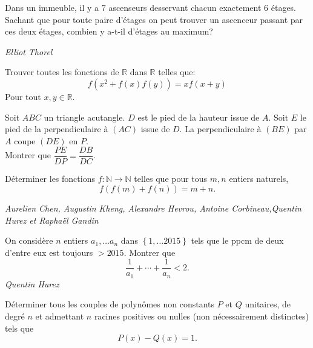 \begin{exo}{}
Dans un immeuble, il y a $7$ ascenseurs desservant chacun exactement $6$ étages. Sachant que pour toute paire d'étages on peut trouver un ascenceur passant par ces deux étages, combien y a-t-il d'étages au maximum?

\medskip
\textit{Elliot Thorel}

\end{exo}



\begin{exo}{}
Trouver toutes les fonctions de $\mathbb{R}$ dans $\mathbb{R}$ telles que:
$$f(x^2+f(x)f(y))=xf(x+y)$$
Pour tout $x,y\in \mathbb{R}$.
\end{exo}



\begin{exo}{}
Soit $ABC$ un triangle acutangle. $D$ est le pied de la hauteur issue de $A$. Soit $E$ le
pied de la perpendiculaire à $(AC)$ issue de $D$. La perpendiculaire à $(BE)$ par $A$ coupe $(DE)$ en $P$. \\
Montrer que $\dfrac{PE}{DP}=\dfrac{DB}{DC}$.
\end{exo}


\begin{exo}{}
Déterminer les fonctions $f : \mathbb{N} \rightarrow \mathbb{N}$ telles que pour tous $m,n$ entiers naturels, $$f(f(m)+f(n))=m+n.$$

\medskip
\textit{Aurelien Chen, Augustin Kheng, Alexandre Hevrou, Antoine Corbineau,Quentin Hurez et Raphaël Gandin}

\end{exo}

\begin{exo}{}
On considère $n$ entiers $a_{1},\ldots a_{n}$
dans $\left\{ 1,\ldots2015\right\} $ tels que le ppcm de deux d'entre
eux est toujours $>2015$. Montrer que
\[
\frac{1}{a_{1}}+\cdots+\frac{1}{a_{n}}<2.
\]
\medskip
\textit{Quentin Hurez}

\end{exo}

\begin{exo}{}Déterminer tous les couples de polynômes non constants $P$ et $Q$ unitaires, de degré $n$ et admettant $n$ racines positives ou nulles (non nécessairement distinctes) tels que
$$P(x) - Q(x) = 1.$$
\end{exo}

